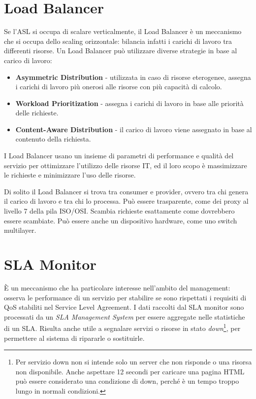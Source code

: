 \section{Load Balancer}
Se l'ASL si occupa di scalare verticalmente, il Load Balancer è un meccanismo che si occupa dello scaling orizzontale: bilancia infatti i carichi di lavoro tra differenti risorse. Un Load Balancer può utilizzare diverse strategie in base al carico di lavoro:
\begin{itemize}
    \item \textbf{Asymmetric Distribution} - utilizzata in caso di risorse eterogenee, assegna i carichi di lavoro più onerosi alle risorse con più capacità di calcolo.
    \item \textbf{Workload Prioritization} - assegna i carichi di lavoro in base alle priorità delle richieste.
    \item \textbf{Content-Aware Distribution} - il carico di lavoro viene assegnato in base al contenuto della richiesta.
\end{itemize}
I Load Balancer usano un insieme di parametri di performance e qualità del servizio per ottimizzare l'utilizzo delle risorse IT, ed il loro scopo è massimizzare le richieste e minimizzare l'uso delle risorse.

Di solito il Load Balancer si trova tra consumer e provider, ovvero tra chi genera il carico di lavoro e tra chi lo processa. Può essere trasparente, come dei proxy al livello 7 della pila ISO/OSI. Scambia richieste esattamente come dovrebbero essere scambiate. Può essere anche un dispositivo hardware, come uno switch multilayer.

\section{SLA Monitor}
È un meccanismo che ha particolare interesse nell'ambito del management: osserva le performance di un servizio per stabilire se sono rispettati i requisiti di QoS stabiliti nel Service Level Agreement. I dati raccolti dal SLA monitor sono processati da un \textit{SLA Management System} per essere aggregate nelle statistiche di un SLA. Risulta anche utile a segnalare servizi o risorse in stato \textit{down}\footnote{Per servizio down non si intende solo un server che non risponde o una risorsa non disponibile. Anche aspettare 12 secondi per caricare una pagina HTML può essere considerato una condizione di down, perché è un tempo troppo lungo in normali condizioni.}, per permettere al sistema di ripararle o sostituirle.

